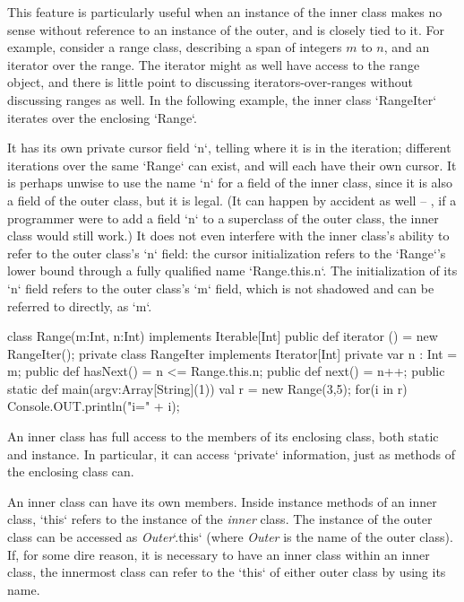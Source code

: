 \begin{ex}
This feature is particularly useful when an instance of the inner class makes
no sense without reference to an instance of the outer, and is closely tied to
it.  For example, consider a range class, describing a span of integers {$m$}
to {$n$}, and an iterator over the range.  The iterator might as well have
access to the range object, and there is little point to discussing
iterators-over-ranges without discussing ranges as well.
In the following example, the inner class \xcd`RangeIter` iterates over the
enclosing \xcd`Range`.  

It has its own private cursor field \xcd`n`, telling
where it is in the iteration; different iterations over the same \xcd`Range`
can exist, and will each have their own cursor.
It is perhaps unwise to use the name \xcd`n` for a field of the inner class,
since it is also a field of the outer class, but it is legal.  (It can happen
by accident as well -- \eg, if a programmer were to add a field \xcd`n` to a
superclass of the  outer class, the inner class would still work.)
It does not even
interfere with the inner class's ability to refer to the outer class's \xcd`n`
field: the cursor initialization 
refers to the \xcd`Range`'s lower bound through a fully qualified name
\xcd`Range.this.n`.
The initialization of its \xcd`n` field refers to the outer class's \xcd`m` field, which is
not shadowed and can be referred to directly, as \xcd`m`.


\begin{xten}
class Range(m:Int, n:Int) implements Iterable[Int]{
  public def iterator ()  = new RangeIter();
  private class RangeIter implements Iterator[Int] {
     private var n : Int = m;
     public def hasNext() = n <= Range.this.n;
     public def next() = n++;
  }
  public static def main(argv:Array[String](1)) {
    val r = new Range(3,5);
    for(i in r) Console.OUT.println("i=" + i);
  }
}
\end{xten}
%
\end{ex}

An inner class has full access to the members of its enclosing class, both
static and instance.  In particular, it can access \xcd`private` information,
just as methods of the enclosing class can.  

An inner class can have its own members.  
Inside instance methods of an inner class, \xcd`this` refers to the instance
of the {\em inner} class.  The instance of the outer class can be accessed as
{\em Outer}\xcd`.this` (where {\em Outer} is the name of the outer class).
If, for some dire reason, it is necessary to have an inner class within an inner
class, the innermost class can refer to the \xcd`this` of either outer class
by using its name.

